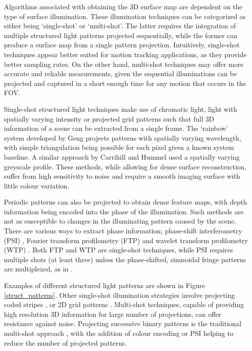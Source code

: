\documentclass[class=article, crop=false]{standalone}
\begin{document}
\par
Algorithms associated with obtaining the 3D surface map are dependent on the type of surface illumination. These illumination techniques can be categorized as either being ‘single-shot’ or ‘multi-shot’. The latter requires the integration of multiple structured light patterns projected sequentially, while the former can produce a surface map from a single pattern projection. Intuitively, single-shot techniques appear better suited for motion tracking applications, as they provide better sampling rates. On the other hand, multi-shot techniques may offer more accurate and reliable measurements, given the sequential illuminations can be projected and captured in a short enough time for any motion that occurs in the FOV. 
\par
Single-shot structured light techniques make use of chromatic light, light with spatially varying intensity or projected grid patterns such that full 3D information of a scene can be extracted from a single frame. The `rainbow' system developed by Geng \parencite*{JasonGeng1996} projects patterns with spatially varying wavelength, with simple triangulation being possible for each pixel given a known system baseline. A similar approach by Carrihill and Hummel \parencite*{Carrihill1985} used a spatially varying greyscale profile. These methods, while allowing for dense surface reconstruction, suffer from high sensitivity to noise and require a smooth imaging surface with little colour variation.
\par
Periodic patterns can also be projected to obtain dense feature maps, with depth information being encoded into the phase of the illumination. Such methods are not as susceptible to changes in the illuminating pattern caused by the scene. There are various ways to extract phase information; phase-shift interferometry (PSI) \parencite{ISI:A1974U657500060,Huang1999}, Fourier transform profilometry (FTP) \parencite{Takeda:83,Yue20071170} and wavelet transform profilometry (WTP) \parencite{Gdeisat2006482,Fernandez2010}. Both FTP and WTP are single-shot techniques, while PSI requires multiple shots (at least three) unless the phase-shifted, sinusoidal fringe patterns are multiplexed, as in \cite{Huang1999}.
\par
Examples of different structured light patterns are shown in Figure \ref{struct_patterns}. Other single-shot illumination strategies involve projecting coded stripes \parencite{Boyer1987,Forster2007,Zhang2002}, or 2D grid patterns \parencite{Petriu2000,Pages2006,Albitar2006}. Multi-shot techniques, capable of providing high resolution 3D information for large number of projections, can offer resistance against noise. Projecting successive binary patterns is the traditional multi-shot approach \parencite{Posdamer1982}, with the addition of colour encoding \parencite{Caspi1998} or PSI \parencite{Huang2006} helping to reduce the number of projected patterns.
\end{document}
